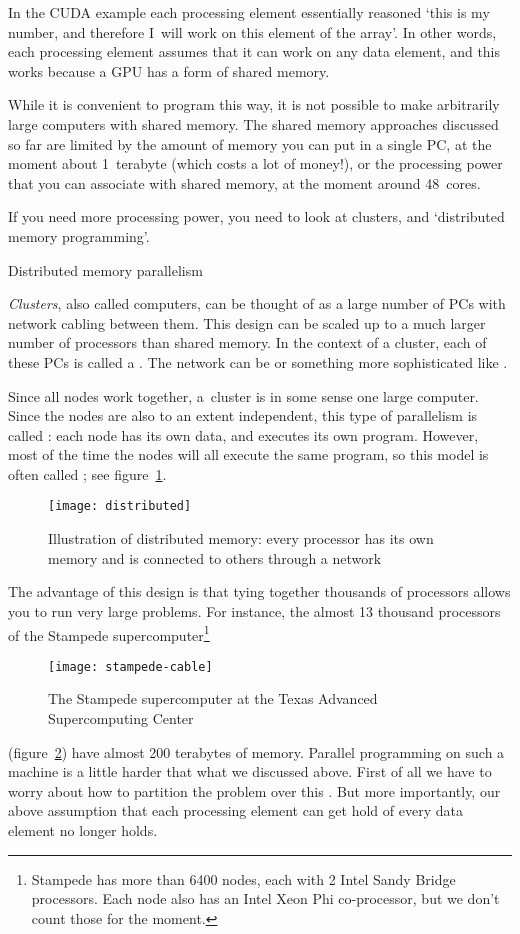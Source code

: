In the CUDA example each
processing element essentially reasoned `this is my number, and
therefore I~will work on this element of the array'. 
In other words, each processing element assumes that it can 
work on any data element, and this works
because a GPU has a form of shared memory.

While it is convenient to program this way, it is not possible to make
arbitrarily large computers with shared memory.
The shared memory approaches discussed so far are limited by the
amount of memory you can put in a single PC, at the moment about
1~terabyte (which costs a lot of money!), or the processing power
that you can associate with shared memory, at the moment around
48~cores.

If you need more processing power, you need to look at clusters,
and `distributed memory programming'.

 {Distributed memory parallelism}
\label{sec:spmd}

\emph{Clusters},
also called  computers,
can be thought of
as a large number of PCs with network cabling between them.
This design can be scaled up to a much larger number of processors
than shared memory.
In the context of a cluster, each of these PCs
is called a . The network can be
 or something more sophisticated like .

Since all nodes work together, a~cluster is in some sense one
large computer. 
Since the nodes are also to an extent independent, this type of parallelism is
called : each node has its own data, and executes its own program.
However, most of the time the nodes will all execute
the same program, so this model is often called ; see figure~\ref{fig:spmd}.
\begin{figure}[ht]
  \texttt{[image: distributed]}
  \caption{Illustration of distributed memory: every processor has its
    own memory and is connected to others through a network}
  \label{fig:spmd}
\end{figure}
%
The advantage of this design is that tying
together thousands of processors allows you to run very large problems.
For instance, the almost 13 thousand processors of the Stampede supercomputer\footnote
{Stampede has more than 6400 nodes, each with 2 Intel Sandy Bridge processors.
Each node also has an Intel Xeon Phi co-processor, but we don't count those for the moment.}
\begin{figure}[ht]
  \texttt{[image: stampede-cable]}
  \caption{The Stampede supercomputer at the Texas Advanced Supercomputing Center}
  \label{fig:stampede}
\end{figure}
(figure~\ref{fig:stampede}) have almost 200 terabytes of memory.
Parallel programming on such a machine is a little harder
that what we discussed above.
First of all we have to worry about
how to partition the problem over this .
But more importantly, our above assumption that each processing element
can get hold of every data element no longer holds.

